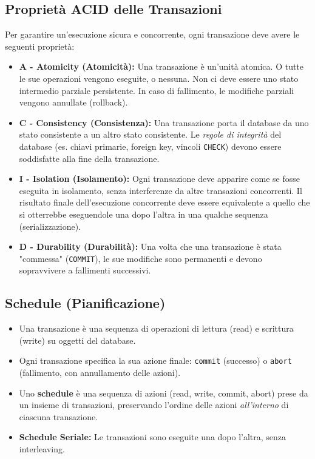 \subsection{Proprietà ACID delle Transazioni}
Per garantire un'esecuzione sicura e concorrente, ogni transazione deve avere le seguenti proprietà:
\begin{itemize}
    \item \textbf{A - Atomicity (Atomicità):} Una transazione è un'unità atomica. O tutte le sue operazioni vengono eseguite, o nessuna. Non ci deve essere uno stato intermedio parziale persistente. In caso di fallimento, le modifiche parziali vengono annullate (rollback).
    \item \textbf{C - Consistency (Consistenza):} Una transazione porta il database da uno stato consistente a un altro stato consistente. Le \textit{regole di integrità} del database (es. chiavi primarie, foreign key, vincoli \texttt{CHECK}) devono essere soddisfatte alla fine della transazione.
    \item \textbf{I - Isolation (Isolamento):} Ogni transazione deve apparire come se fosse eseguita in isolamento, senza interferenze da altre transazioni concorrenti. Il risultato finale dell'esecuzione concorrente deve essere equivalente a quello che si otterrebbe eseguendole una dopo l'altra in una qualche sequenza (serializzazione).
    \item \textbf{D - Durability (Durabilità):} Una volta che una transazione è stata "commessa" (\texttt{COMMIT}), le sue modifiche sono permanenti e devono sopravvivere a fallimenti successivi.
\end{itemize}

\subsection{Schedule (Pianificazione)}
\begin{itemize}
    \item Una transazione è una sequenza di operazioni di lettura (read) e scrittura (write) su oggetti del database.
    \item Ogni transazione specifica la sua azione finale: \texttt{commit} (successo) o \texttt{abort} (fallimento, con annullamento delle azioni).
    \item Uno \textbf{schedule} è una sequenza di azioni (read, write, commit, abort) prese da un insieme di transazioni, preservando l'ordine delle azioni \textit{all'interno} di ciascuna transazione.
    \item \textbf{Schedule Seriale:} Le transazioni sono eseguite una dopo l'altra, senza interleaving.
\end{itemize}

